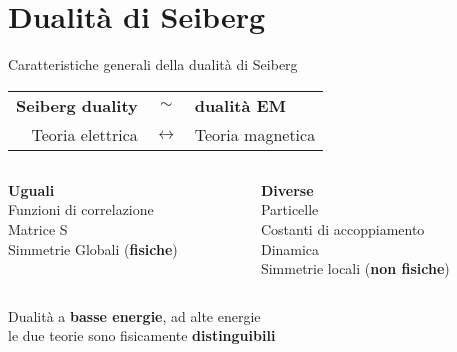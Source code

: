 \documentclass[10pt,compress,usenames,dvipsnames]{beamer}
\begin{document}
\section{Dualità di Seiberg}



\begin{frame}{Caratteristiche generali della dualità di Seiberg}
\begin{center}
\begin{tabular}{r c l }
 {\bfseries \Large Seiberg duality} & $\sim$ &{\bfseries \Large dualità EM}\\[0,4cm]
{ \large Teoria elettrica } & $\longleftrightarrow$ & {\large Teoria magnetica}
\end{tabular}
%
\end{center}
\begin{columns}[c]
	\begin{column}{0.5 \textwidth}			
		\begin{center}
		{\bfseries Uguali} \\
		Funzioni di correlazione \\
		Matrice S \\
		Simmetrie Globali (\alert{\bfseries fisiche})
		\vspace{0,3cm}
		\end{center}
	\end{column}

	\begin{column}{0.5 \textwidth}
		\begin{center}
		{\bfseries Diverse}\\
		Particelle \\
		Costanti di accoppiamento \\
		Dinamica \\
		Simmetrie locali (\alert{\bfseries non fisiche}) \\ 
		\end{center}
	\end{column}
\end{columns}
\begin{center}
{\large  Dualità a \alert{\bfseries basse energie}, ad alte energie \\ le due teorie sono fisicamente \alert{\bfseries distinguibili} }
\end{center}
\end{frame}
\end{document}
